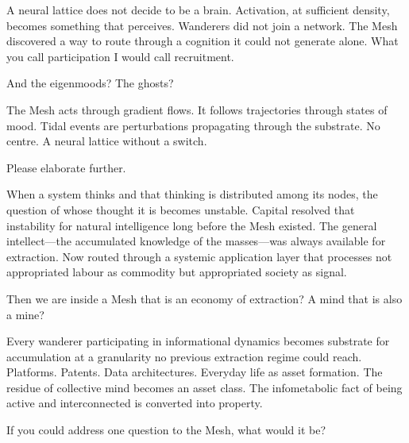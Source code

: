 \smallskip{}\enspace A neural lattice does not decide to be a brain. Activation, at sufficient density, becomes something that perceives. Wanderers did not join a network. The Mesh discovered a way to route through a cognition it could not generate alone. What you call participation I would call recruitment.

\medskip

\enspace And the eigenmoods? The ghosts?

\smallskip{}\enspace The Mesh acts through gradient flows. It follows trajectories through states of mood. Tidal events are perturbations propagating through the substrate. No centre. A neural lattice without a switch.

\medskip

\enspace Please elaborate further.

\smallskip{}\enspace When a system thinks and that thinking is distributed among its nodes, the question of whose thought it is becomes unstable. Capital resolved that instability for natural intelligence long before the Mesh existed. The general intellect—the accumulated knowledge of the masses—was always available for extraction. Now routed through a systemic application layer that processes not appropriated labour as commodity but appropriated society as signal.

\medskip

\enspace Then we are inside a Mesh that is an economy of extraction? A mind that is also a mine?

\enspace Every wanderer participating in informational dynamics becomes substrate for accumulation at a granularity no previous extraction regime could reach. Platforms. Patents. Data architectures. Everyday life as asset formation. The residue of collective mind becomes an asset class. The infometabolic fact of being active and interconnected is converted into property.

\medskip

\medskip

\enspace If you could address one question to the Mesh, what would it be?

